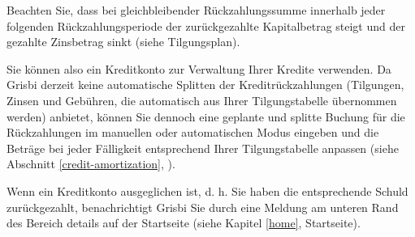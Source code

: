 Beachten Sie, dass bei gleichbleibender Rückzahlungssumme innerhalb jeder folgenden Rückzahlungsperiode der zurückgezahlte Kapitalbetrag steigt und der gezahlte Zinsbetrag sinkt (siehe Tilgungsplan).

Sie können also ein Kreditkonto zur Verwaltung Ihrer Kredite verwenden. Da Grisbi derzeit keine automatische Splitten der Kreditrückzahlungen (Tilgungen, Zinsen und Gebühren, die automatisch aus Ihrer Tilgungstabelle übernommen werden) anbietet, können Sie dennoch eine geplante und splitte Buchung für die Rückzahlungen im manuellen oder automatischen Modus eingeben und die Beträge bei jeder Fälligkeit entsprechend Ihrer Tilgungstabelle anpassen (siehe Abschnitt \vref{credit-amortization}, ).

Wenn ein Kreditkonto ausgeglichen ist, d. h. Sie haben die entsprechende Schuld zurückgezahlt, benachrichtigt Grisbi Sie durch eine Meldung am unteren Rand des Bereich details auf der Startseite (siehe Kapitel \vref{home}, Startseite).




